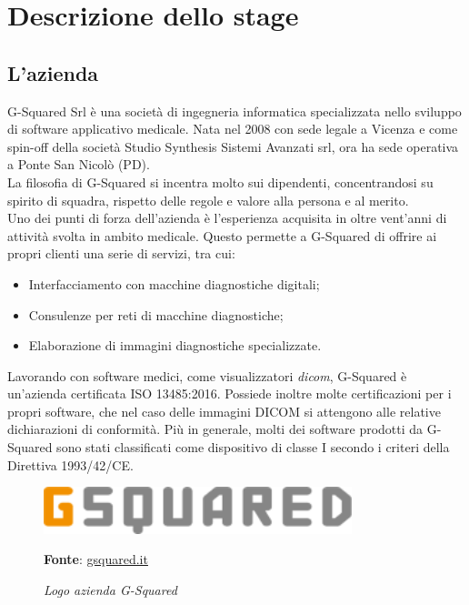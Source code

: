 
\chapter{Descrizione dello stage}
\label{cap:descrizione-stage}
\section{L'azienda}
\label{azienda}
G-Squared Srl è una società di ingegneria informatica specializzata nello sviluppo di software applicativo medicale. Nata nel 2008 con sede legale a Vicenza e come spin-off della società Studio Synthesis Sistemi Avanzati srl, ora ha sede operativa a Ponte San Nicolò (PD).
\\
La filosofia di G-Squared si incentra molto sui dipendenti, concentrandosi su spirito di squadra, rispetto delle regole e valore alla persona e al merito.
\\
Uno dei punti di forza dell’azienda è l'esperienza acquisita in oltre vent’anni di attività svolta in ambito medicale. Questo permette a G-Squared di offrire ai propri clienti una serie di servizi, tra cui:
\begin{itemize}
	\item Interfacciamento con macchine diagnostiche digitali;
	\item Consulenze per reti di macchine diagnostiche;
	\item Elaborazione di immagini diagnostiche specializzate.
\end{itemize}

Lavorando con software medici, come visualizzatori \textit{dicom}, G-Squared è un'azienda certificata ISO 13485:2016. Possiede inoltre molte certificazioni per i propri software, che nel caso delle immagini DICOM si attengono alle relative dichiarazioni di conformità. Più in generale, molti dei software prodotti da G-Squared sono stati classificati come dispositivo di classe I secondo i criteri della Direttiva 1993/42/CE.

\begin{figure}[ht]
    \centering
    \includegraphics[width=0.8\textwidth]{immagini/logo-azienda.png}
    \caption{\textit{Logo azienda G-Squared}}
    \textbf{Fonte}: \href{https://www.gsquared.it/it}{gsquared.it}
    \label{fig: Logo azienda G-Squared}
\end{figure}
\newpage

